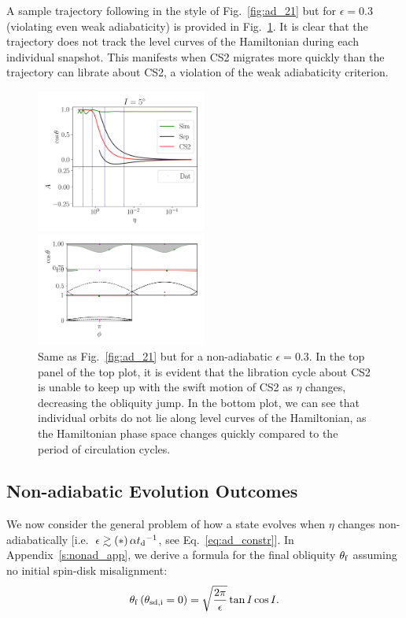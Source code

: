 \documentclass[
        fleqn,
        usenatbib,
    ]{mnras}
\newcommand*{\p}[1]{\left(#1\right)}
\begin{document}
A sample trajectory following in the style of Fig.~\ref{fig:ad_21} but for
$\epsilon = 0.3$ (violating even weak adiabaticity) is provided in
Fig.~\ref{fig:nonad_traj}. It is clear that the trajectory does not track the
level curves of the Hamiltonian during each individual snapshot. This manifests
when CS2 migrates more quickly than the trajectory can librate about CS2, a
violation of the weak adiabaticity criterion.
\begin{figure}
    \centering
    \includegraphics[width=0.5\textwidth]{plots_diskdisp/3testo_nonad.png}

    \includegraphics[width=0.5\textwidth]{plots_diskdisp/3testo_nonad_subplots.png}
    \caption{Same as Fig.~\ref{fig:ad_21} but for a non-adiabatic $\epsilon =
    0.3$. In the top panel of the top plot, it is evident that the libration
    cycle about CS2 is unable to keep up with the swift motion of CS2 as $\eta$
    changes, decreasing the obliquity jump. In the bottom plot, we can see that
    individual orbits do not lie along level curves of the Hamiltonian, as the
    Hamiltonian phase space changes quickly compared to the period of
    circulation cycles.}\label{fig:nonad_traj}
\end{figure}

\subsection{Non-adiabatic Evolution Outcomes}

We now consider the general problem of how a state evolves when $\eta$ changes
non-adiabatically [i.e.\ $\epsilon \gtrsim \p*{\alpha t_{\rm d}}^{-1}$, see
Eq.~\eqref{eq:ad_constr}]. In Appendix~\ref{s:nonad_app}, we derive a formula
for the final obliquity $\theta_{\rm f}$ assuming no initial spin-disk
misalignment:
\begin{equation}
    \theta_{\rm f}\p{\theta_{\rm sd, i} = 0} = \sqrt{\frac{2\pi}{\epsilon}} \tan
        I\cos I.\label{eq:nonad_q_f}
\end{equation}
\end{document}
